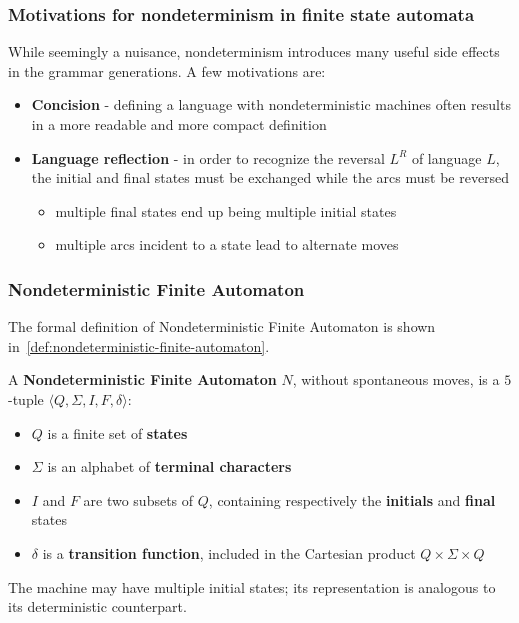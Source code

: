 \documentclass[english]{article}
\begin{document}
\subsubsection{Motivations for nondeterminism in finite state automata}

While seemingly a nuisance, nondeterminism introduces many useful side effects in the grammar generations.
A few motivations are:

\begin{itemize}
  \item \textbf{Concision} - defining a language with nondeterministic machines often results in a more readable and more compact definition
  \item \textbf{Language reflection} - in order to recognize the reversal \(L^R\) of language \(L\), the initial and final states must be exchanged while the arcs must be reversed
        \begin{itemize}[label=\(\rightarrow\)]
          \item multiple final states end up being multiple initial states
          \item multiple arcs incident to a state lead to alternate moves
        \end{itemize}
\end{itemize}

\subsubsection{Nondeterministic Finite Automaton}
\label{sec:nondeterministic-finite-automaton}

The formal definition of Nondeterministic Finite Automaton is shown in~\ref{def:nondeterministic-finite-automaton}.

\begin{definition}
  \label{def:nondeterministic-finite-automaton}
  A \textbf{Nondeterministic Finite Automaton} \(N\), without spontaneous moves, is a \(5\)-tuple \(\langle Q, \Sigma, I, F, \delta \rangle\):

  \begin{itemize}
    \item \(Q\) is a finite set of \textbf{states}
    \item \(\Sigma\) is an alphabet of \textbf{terminal characters}
    \item \(I\) and \(F\) are two subsets of \(Q\), containing respectively the \textbf{initials} and \textbf{final} states
    \item \(\delta\) is a \textbf{transition function}, included in the Cartesian product \(Q \times \Sigma \times Q\)
  \end{itemize}

  The machine may have multiple initial states;
  its representation is analogous to its deterministic counterpart.
\end{definition}
\end{document}
